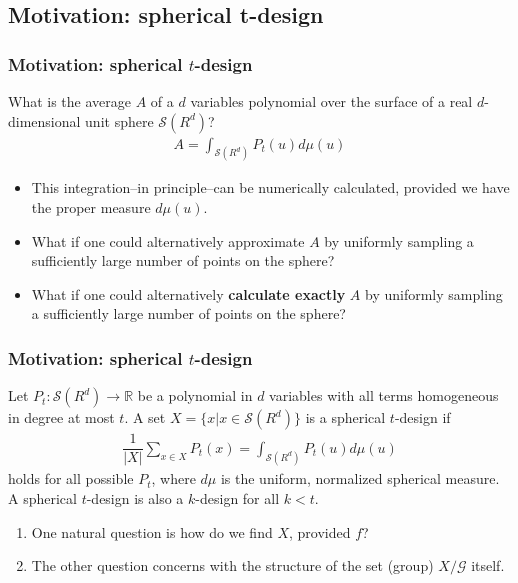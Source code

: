 \documentclass{beamer}
\begin{document}
\subsection{Motivation: spherical t-design}
\begin{frame}
  \frametitle{Motivation: spherical $t$-design}
  \begin{problem}
    What is the average $A$ of a $d$ variables polynomial over the surface of a real $d$-dimensional unit sphere $\mathcal{S}(R^d)$?
    \begin{align}A = \int_{\mathcal{S}(R^d)} P_t(u)d\mu(u)
    \end{align}
  \end{problem}
  \begin{itemize}
    \item This integration--in principle--can be numerically calculated, provided we have the proper measure $d\mu(u)$.
    \item What if one could alternatively approximate $A$ by uniformly sampling a sufficiently large number of points on the sphere?
    \item What if one could alternatively \textbf{calculate exactly} $A$ by uniformly sampling a sufficiently large number of points on the sphere?
  \end{itemize}
\end{frame}
\begin{frame}
  \frametitle{Motivation: spherical $t$-design}
  \begin{definition}
    Let $P_t:\mathcal{S}(R^d)\rightarrow \mathbb{R}$ be a polynomial in $d$ variables with all terms homogeneous in degree at most $t$. A set $X=\{x\vert x\in\mathcal{S}(R^d)\}$ is a spherical $t$-design if 
    \begin{align} 
      \dfrac{1}{\vert X \vert} \sum_{x\in X} P_t(x) = \int_{\mathcal{S}(R^d)}P_t(u)d\mu(u) 
    \end{align}
    holds for all possible $P_t$, where $d\mu$ is the uniform, normalized spherical measure. A spherical $t$-design is also a $k$-design for all $k<t$.
  \end{definition}
  \begin{enumerate}
    \item One natural question is how do we find $X$, provided $f$?
    \item The other question concerns with the structure of the set (group) $X/\mathcal{G}$ itself.
  \end{enumerate}
\end{frame}
\end{document}
